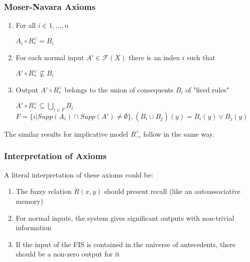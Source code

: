 \documentclass{beamer}
\begin{document}
\begin{frame}
\frametitle{Moser-Navara Axioms}
\begin{enumerate}
\item For all $i \in {1,\dots,n}$
\begin{center}
$A_{i} \circ R^{\vee}_{\ast} = B_{i}$
\end{center}

\hfill

\item For each normal input $A' \in \mathcal{F}(X)$ there is an index $i$ such that
\begin{center}
$A' \circ R^{\vee}_{\ast} \nsubseteq B_{i}$
\end{center}

\hfill

\item Output $A' \circ R^{\vee}_{\ast}$ belongs to the union of consequents $B_{i}$ of "fired rules"
\begin{center}
$A' \circ R^{\vee}_{\ast} \subseteq \bigcup\limits_{i \in F} B_{i}$\\
$F = \{i|Supp(A_{i})\cap Supp(A') \neq \emptyset\}, (B_{i} \cup B_{j})(y) = B_{i}(y) \vee B_{j}(y)$
\end{center}
\end{enumerate}

\hfill

The similar results for implicative model $R^{\wedge}_{\rightarrow}$ follow in the same way.\par

\end{frame}


\begin{frame}
\frametitle{Interpretation of Axioms}
A literal interpretation of these axioms could be:
\begin{enumerate}
\item The fuzzy relation $R(x,y)$ should present recall (like an autoassociative memory)

\hfill

\item For normal inputs, the system gives significant outputs with non-trivial information

\hfill

\item If the input of the FIS is contained in the universe of antecedents, there should be a non-zero output for it
\end{enumerate}

\end{frame}
\end{document}
